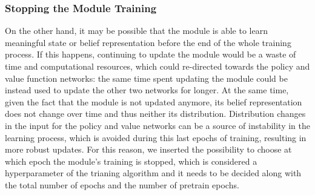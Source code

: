             \subsubsection{Stopping the Module Training}
                On the other hand, it may be possible that the module is able to learn meaningful state or belief representation before the end of the whole training process. If this happens, continuing to update the module would be a waste of time and computational resources, which could re-directed towards the policy and value function networks: the same time spent updating the module could be instead used to update the other two networks for longer. At the same time, given the fact that the module is not updated anymore, its belief representation does not change over time and thus neither its distribution. Distribution changes in the input for the policy and value networks can be a source of instability in the learning process, which is avoided during this last epochs of training, resulting in more robust updates. \newline
                For this reason, we inserted the possibility to choose at which epoch the module's training is stopped, which is considered a hyperparameter of the trianing algorithm and it needs to be decided along with the total number of epochs and the number of pretrain epochs.
                
